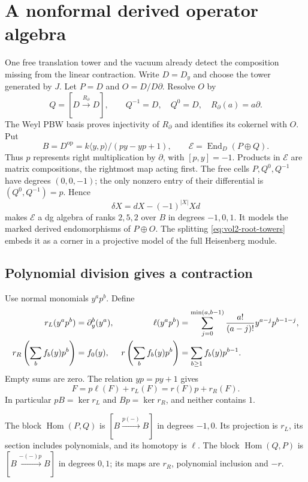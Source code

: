 \section{A nonformal derived operator algebra}
\label{sec:vol2-root-composition}

One free translation tower and the vacuum already detect the
composition missing from the linear contraction. Write $D=D_y$
and choose the tower generated by $J$. Let $P=D$ and
$O=D/D\partial$. Resolve $O$ by
\[
 Q=[D\xrightarrow{R_\partial}D],\qquad
 Q^{-1}=D,\quad Q^0=D,\quad R_\partial(a)=a\partial.
\]
The Weyl PBW basis proves injectivity of $R_\partial$ and identifies
its cokernel with $O$. Put
\[
 B=D^{\mathrm{op}}=k\langle y,p\rangle/(py-yp+1),\qquad
 \mathscr E=\operatorname{End}_D(P\oplus Q).
\]
Thus $p$ represents right multiplication by $\partial$, with
$[p,y]=-1$. Products in $\mathscr E$ are matrix compositions, the
rightmost map acting first. The free cells $P,Q^0,Q^{-1}$ have
degrees $(0,0,-1)$; the only nonzero entry of their differential
is $(Q^0,Q^{-1})=p$. Hence
\[
 \delta X=dX-(-1)^{|X|}Xd
\]
makes $\mathscr E$ a dg algebra of ranks $2,5,2$ over $B$ in
degrees $-1,0,1$. It models the marked derived endomorphisms of
$P\oplus O$. The splitting \eqref{eq:vol2-root-towers} embeds it
as a corner in a projective model of the full Heisenberg module.

\subsection{Polynomial division gives a contraction}

Use normal monomials $y^ap^b$. Define
\begin{align}\label{eq:vol2-weyl-remainders}
 r_L(y^ap^b)&=\partial_y^b(y^a),&
 \ell(y^ap^b)&=\sum_{j=0}^{\min(a,b-1)}
                    \frac{a!}{(a-j)!}y^{a-j}p^{b-1-j},\\
 r_R\left(\sum_bf_b(y)p^b\right)&=f_0(y),&
 r\left(\sum_bf_b(y)p^b\right)&=\sum_{b\geq1}f_b(y)p^{b-1}.
 \notag
\end{align}
Empty sums are zero. The relation $yp=py+1$ gives
\begin{equation}\label{eq:vol2-weyl-divisions}
 F=p\ell(F)+r_L(F)=r(F)p+r_R(F).
\end{equation}
In particular $pB=\ker r_L$ and $Bp=\ker r_R$, and neither
contains $1$.

The block $\operatorname{Hom}(P,Q)$ is
$[B\xrightarrow{p(-)}B]$ in degrees $-1,0$. Its projection is
$r_L$, its section includes polynomials, and its homotopy is
$\ell$. The block $\operatorname{Hom}(Q,P)$ is
$[B\xrightarrow{-(-)p}B]$ in degrees $0,1$; its maps are
$r_R$, polynomial inclusion and $-r$.

